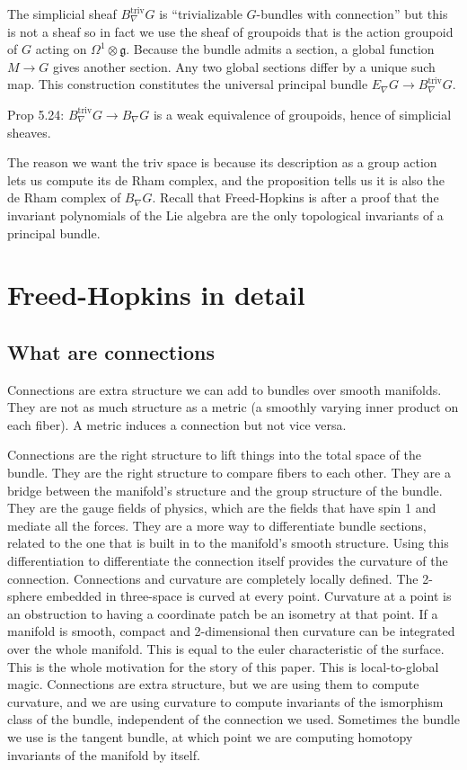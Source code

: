 \documentclass[12pt]{article}
\begin{document}
The simplicial sheaf $B_{\nabla}^{\mathrm{triv}}G$ is ``trivializable $G$-bundles with connection'' but this is not a sheaf so in fact we use the sheaf of groupoids that is the action groupoid of $G$ acting on $\Omega^1 \otimes\mathfrak{g}$. Because the bundle admits a section, a global function $M\to G$ gives another section. Any two global sections differ by a unique such map. This construction constitutes the universal principal bundle $E_{\nabla}G \to B_{\nabla}^{\mathrm{triv}}G$.

Prop 5.24:  $B_{\nabla}^{\mathrm{triv}}G\to B_{\nabla}G$ is a weak equivalence of groupoids, hence of simplicial sheaves.

The reason we want the triv space is because its description as a group action lets us compute its de Rham complex, and the proposition tells us it is also the de Rham complex of $B_{\nabla}G$. Recall that Freed-Hopkins is after a proof that the invariant polynomials of the Lie algebra are the only topological invariants of a principal bundle.

\section{Freed-Hopkins in detail}
\subsection{What are connections}
Connections are extra structure we can add to bundles over smooth manifolds. They are not as much structure as a metric (a smoothly varying inner product on each fiber). A metric induces a connection but not vice versa.

Connections are the right structure to lift things into the total space of the bundle. They are the right structure to compare fibers to each other. They are a bridge between the manifold's structure and the group structure of the bundle. They are the gauge fields of physics, which are the fields that have spin 1 and mediate all the forces. They are a more way to differentiate bundle sections, related to the one that is built in to the manifold's smooth structure. Using this differentiation to differentiate the connection itself provides the curvature of the connection. Connections and curvature are completely locally defined. The 2-sphere embedded in three-space is curved at every point. Curvature at a point is an obstruction to having a coordinate patch be an isometry at that point. If a manifold is smooth, compact and 2-dimensional then curvature can be integrated over the whole manifold. This is equal to the euler characteristic of the surface. This is the whole motivation for the story of this paper. This is local-to-global magic. Connections are extra structure, but we are using them to compute curvature, and we are using curvature to compute invariants of the ismorphism class of the bundle, independent of the connection we used. Sometimes the bundle we use is the tangent bundle, at which point we are computing homotopy invariants of the manifold by itself.
\end{document}
